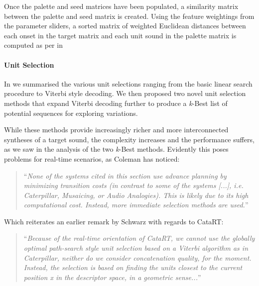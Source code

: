 Once the palette and seed matrices have been populated, a similarity matrix between the palette and seed matrix is created. Using the feature weightings from the parameter sliders, a sorted matrix of weighted Euclidean distances between each onset in the target matrix and each unit sound in the palette matrix is computed as per  in 

\paragraph{Unit Selection}

In  we summarised the various unit selections ranging from the basic linear search procedure to Viterbi style decoding. We then proposed two novel unit selection methods that expand Viterbi decoding further to produce a \textit{k}-Best list of potential sequences for exploring variations.

While these methods provide increasingly richer and more interconnected syntheses of a target sound, the complexity increases and the performance suffers, as we saw in the analysis of the two \textit{k}-Best methods. Evidently this poses problems for real-time scenarios, as  Coleman has noticed:

\blockcquote[]{Coleman2015}{``\textit{None of the systems cited in this section use advance planning by minimizing transition costs (in contrast to some of the systems [...], i.e. Caterpillar, Musaicing, or Audio Analogies). This is likely due to its high computational cost. Instead, more immediate selection methods are used.}''}

Which reiterates an earlier remark by Schwarz with regards to CataRT:

\blockcquote[]{Schwarz2006b}{``\textit{Because of the real-time orientation of CataRT, we cannot use the globally optimal path-search style unit selection based on a Viterbi algorithm as in Caterpillar, neither do we consider concatenation quality, for the moment. Instead, the selection is based on finding the units closest to the current position x in the descriptor space, in a geometric sense...}''}

